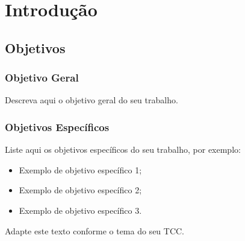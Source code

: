 \chapter{Introdução}

\section{Objetivos}

\subsection{Objetivo Geral}

Descreva aqui o objetivo geral do seu trabalho.

\subsection{Objetivos Específicos}
Liste aqui os objetivos específicos do seu trabalho, por exemplo:
\begin{itemize}
    \item Exemplo de objetivo específico 1;
    \item Exemplo de objetivo específico 2;
    \item Exemplo de objetivo específico 3.
\end{itemize}

Adapte este texto conforme o tema do seu TCC.